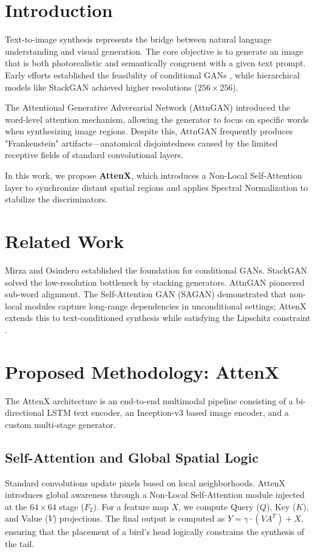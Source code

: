\documentclass[conference]{IEEEtran}
\begin{document}
\section{Introduction}
Text-to-image synthesis represents the bridge between natural language understanding and visual generation. The core objective is to generate an image that is both photorealistic and semantically congruent with a given text prompt. Early efforts established the feasibility of conditional GANs \cite{reed2016generative}, while hierarchical models like StackGAN \cite{zhang2017stackgan} achieved higher resolutions ($256 \times 256$).

The Attentional Generative Adversarial Network (AttnGAN) \cite{xu2018attngan} introduced the word-level attention mechanism, allowing the generator to focus on specific words when synthesizing image regions. Despite this, AttnGAN frequently produces "Frankenstein" artifacts—anatomical disjointedness caused by the limited receptive fields of standard convolutional layers. 

In this work, we propose \textbf{AttenX}, which introduces a Non-Local Self-Attention layer to synchronize distant spatial regions and applies Spectral Normalization to stabilize the discriminators.

\section{Related Work}
Mirza and Osindero \cite{mirza2014conditional} established the foundation for conditional GANs. StackGAN \cite{zhang2017stackgan} solved the low-resolution bottleneck by stacking generators. AttnGAN \cite{xu2018attngan} pioneered sub-word alignment. The Self-Attention GAN (SAGAN) \cite{zhang2019self} demonstrated that non-local modules capture long-range dependencies in unconditional settings; AttenX extends this to text-conditioned synthesis while satisfying the Lipschitz constraint \cite{miyato2018spectral}.

\section{Proposed Methodology: AttenX}
The AttenX architecture is an end-to-end multimodal pipeline consisting of a bi-directional LSTM text encoder, an Inception-v3 based image encoder, and a custom multi-stage generator.

\subsection{Self-Attention and Global Spatial Logic}
Standard convolutions update pixels based on local neighborhoods. AttenX introduces global awareness through a Non-Local Self-Attention module injected at the $64 \times 64$ stage ($F_2$). For a feature map $X$, we compute Query ($Q$), Key ($K$), and Value ($V$) projections. The final output is computed as $Y = \gamma \cdot (V A^T) + X$, ensuring that the placement of a bird's head logically constrains the synthesis of the tail.
\end{document}
